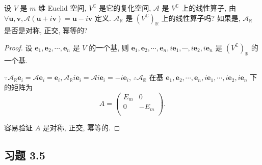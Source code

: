 \documentclass{ctexart}
\begin{document}
\begin{exercise}%
    设 $V$ 是 $m$ 维 Euclid 空间, $V^\mathbb{C}$ 是它的复化空间, $\mathcal{A}$ 是 $V^\mathbb{C}$ 上的线性算子, 由 $\forall\boldsymbol{u},\boldsymbol{v},\mathcal{A}(\boldsymbol{u}+i\boldsymbol{v})=\boldsymbol{u}-i\boldsymbol{v}$ 定义. $\mathcal{A}_\mathbb{R}$ 是 $(V^\mathbb{C})_\mathbb{R}$ 上的线性算子吗? 如果是, $\mathcal{A}_\mathbb{R}$ 是否是对称, 正交, 幂等的?
\end{exercise}
\begin{proof}
    设 $\boldsymbol{e}_1,\boldsymbol{e}_2,\cdots,\boldsymbol{e}_n$ 是 $V$ 的一个基, 则 $\boldsymbol{e}_1,\boldsymbol{e}_2,\cdots,\boldsymbol{e}_n,i\boldsymbol{e}_1,\cdots,i\boldsymbol{e}_2,i\boldsymbol{e}_n$ 是 $(V^\mathbb{C})_\mathbb{R}$ 的一个基.

    $\because\mathcal{A}_\mathbb{R}\boldsymbol{e}_i=\mathcal{A}\boldsymbol{e}_i=\boldsymbol{e}_i,\mathcal{A}_\mathbb{R}i\boldsymbol{e}_i=\mathcal{A}i\boldsymbol{e}_i=-i\boldsymbol{e}_i$, $\therefore\mathcal{A}_\mathbb{R}$ 在基 $\boldsymbol{e}_1,\boldsymbol{e}_2,\cdots,\boldsymbol{e}_n,i\boldsymbol{e}_1,\cdots,i\boldsymbol{e}_2,i\boldsymbol{e}_n$ 下的矩阵为
    \[A=\begin{pmatrix}
        E_m & 0 \\
        0 & -E_m \\
    \end{pmatrix}.\]

    容易验证 $A$ 是对称, 正交, 幂等的.
\end{proof}
\subsection{习题 3.5}
\end{document}
